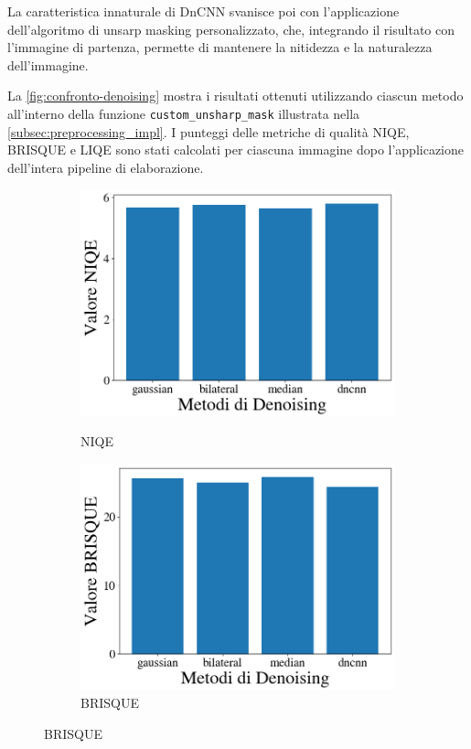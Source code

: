La caratteristica innaturale di DnCNN svanisce poi con l'applicazione dell'algoritmo di unsarp masking personalizzato, che, integrando il risultato con l'immagine di partenza, permette di mantenere la nitidezza e la naturalezza dell'immagine.

La \cref{fig:confronto-denoising} mostra i risultati ottenuti utilizzando ciascun metodo all'interno della funzione \texttt{custom\_unsharp\_mask} illustrata nella \cref{subsec:preprocessing_impl}. I punteggi delle metriche di qualità NIQE, BRISQUE e LIQE sono stati calcolati per ciascuna immagine dopo l'applicazione dell'intera pipeline di elaborazione.

\begin{figure}[H]
    \centering
    \begin{subfigure}[t]{0.32\textwidth}
        \centering
        \caption{NIQE}
        \includegraphics[width=\linewidth]{../assets/denoising_comparison_NIQE.png}
        \label{fig:den_niqe}
    \end{subfigure}
    \hfill
    \begin{subfigure}[t]{0.32\textwidth}
        \centering
        \caption{BRISQUE}
        \includegraphics[width=\linewidth]{../assets/denoising_comparison_BRISQUE.png}

\end{subfigure}
\end{figure}

